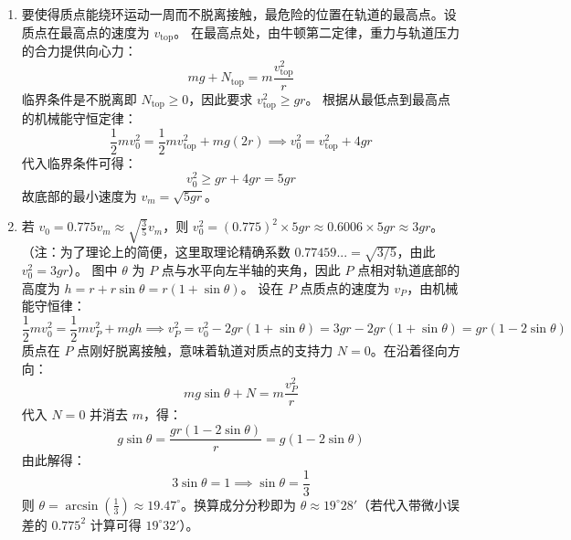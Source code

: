 \begin{solution}
\begin{enumerate}
    \item[(a)] 要使得质点能绕环运动一周而不脱离接触，最危险的位置在轨道的最高点。设质点在最高点的速度为 $v_{\text{top}}$。
    在最高点处，由牛顿第二定律，重力与轨道压力的合力提供向心力：
    $$ mg + N_{\text{top}} = m \frac{v_{\text{top}}^2}{r} $$
    临界条件是不脱离即 $N_{\text{top}} \ge 0$，因此要求 $v_{\text{top}}^2 \ge gr$。
    根据从最低点到最高点的机械能守恒定律：
    $$ \frac{1}{2}mv_0^2 = \frac{1}{2}mv_{\text{top}}^2 + mg(2r) \implies v_0^2 = v_{\text{top}}^2 + 4gr $$
    代入临界条件可得：
    $$ v_0^2 \ge gr + 4gr = 5gr $$
    故底部的最小速度为 $v_m = \sqrt{5gr}$。

    \item[(b)] 若 $v_0 = 0.775 v_m \approx \sqrt{\frac{3}{5}} v_m$，则 $v_0^2 = (0.775)^2 \times 5gr \approx 0.6006 \times 5gr \approx 3gr$。
    （注：为了理论上的简便，这里取理论精确系数 $0.77459... = \sqrt{3/5}$，由此 $v_0^2 = 3gr$）。
    图中 $\theta$ 为 $P$ 点与水平向左半轴的夹角，因此 $P$ 点相对轨道底部的高度为 $h = r + r\sin\theta = r(1 + \sin\theta)$。
    设在 $P$ 点质点的速度为 $v_P$，由机械能守恒律：
    $$ \frac{1}{2}mv_0^2 = \frac{1}{2}mv_P^2 + mgh \implies v_P^2 = v_0^2 - 2gr(1 + \sin\theta) = 3gr - 2gr(1 + \sin\theta) = gr(1 - 2\sin\theta) $$
    质点在 $P$ 点刚好脱离接触，意味着轨道对质点的支持力 $N = 0$。在沿着径向方向：
    $$ mg\sin\theta + N = m \frac{v_P^2}{r} $$
    代入 $N=0$ 并消去 $m$，得：
    $$ g\sin\theta = \frac{gr(1 - 2\sin\theta)}{r} = g(1 - 2\sin\theta) $$
    由此解得：
    $$ 3\sin\theta = 1 \implies \sin\theta = \frac{1}{3} $$
    则 $\theta = \arcsin\left(\frac{1}{3}\right) \approx 19.47^\circ$。换算成分分秒即为 $\theta \approx 19^\circ 28'$（若代入带微小误差的 $0.775^2$ 计算可得 $19^\circ 32'$）。
\end{enumerate}
\end{solution}

